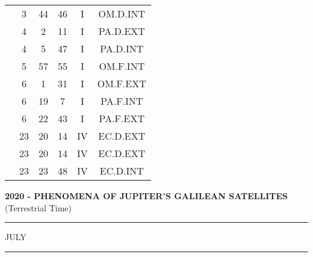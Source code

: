 \documentclass[12pt, a4paper]{article}
\begin{document}
\begin{multicols}{3}
{\begin{tabular}{c c c c c c}
	 	 	 	 & 3 & 44 & 46 & I & OM.D.INT\\%
	 	 	 	 & 4 & 2 & 11 & I & PA.D.EXT\\%
	 	 	 	 & 4 & 5 & 47 & I & PA.D.INT\\%
	 	 	 	 & 5 & 57 & 55 & I & OM.F.INT\\%
	 	 	 	 & 6 & 1 & 31 & I & OM.F.EXT\\%
	 	 	 	 & 6 & 19 & 7 & I & PA.F.INT\\%
	 	 	 	 & 6 & 22 & 43 & I & PA.F.EXT\\%
	 	 	 	 & 23 & 20 & 14 & IV & EC.D.EXT\\%
	 	 	 	 & 23 & 20 & 14 & IV & EC.D.EXT\\%
	 	 	 	 & 23 & 23 & 48 & IV & EC.D.INT\\%
	 	 \end{tabular}
 	}
\end{multicols}
\textbf{2020 - PHENOMENA OF JUPITER'S GALILEAN SATELLITES}\\(Terrestrial Time) 
\vspace{0.1cm} \hrule \vspace{0.1cm}
JULY\vspace{0.1cm}
\hrule
\vspace{-0.2cm}
\end{document}
